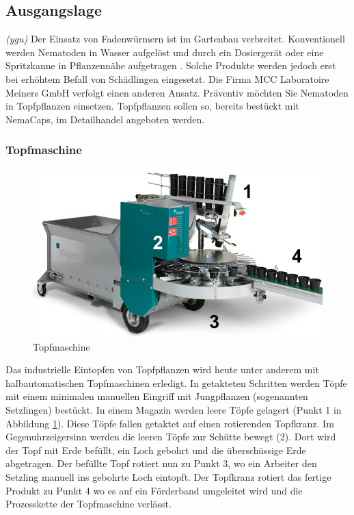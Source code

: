 
\subsection{Ausgangslage}
\textit{(ygu)} Der Einsatz von Fadenwürmern ist im Gartenbau verbreitet. Konventionell werden Nematoden in Wasser aufgelöst und durch ein Dosiergerät oder eine Spritzkanne in Pflanzennähe aufgetragen \cite{birchmeier}. Solche Produkte werden jedoch erst bei erhöhtem Befall von Schädlingen eingesetzt. Die Firma MCC Laboratoire Meiners GmbH verfolgt einen anderen Ansatz. Präventiv möchten Sie Nematoden in Topfpflanzen einsetzen. Topfpflanzen sollen so, bereits bestückt mit NemaCaps, im Detailhandel angeboten werden. 
\subsubsection{Topfmaschine}
\begin{figure}
	\includegraphics[scale=0.5]{Illustrationen/3-Einleitung/schema_topfmaschine.jpg}
	\caption{Topfmaschine \protect\cite{mayer}}
	\label{fig:schema_topfmaschine}
\end{figure}
Das industrielle Eintopfen von Topfpflanzen wird heute unter anderem mit halbautomatischen Topfmaschinen erledigt. In getakteten Schritten werden Töpfe mit einem minimalen manuellen Eingriff mit Jungpflanzen (sogenannten Setzlingen) bestückt. In einem Magazin werden leere Töpfe gelagert (Punkt 1 in Abbildung \ref{fig:schema_topfmaschine}). Diese Töpfe fallen getaktet auf einen rotierenden Topfkranz. Im Gegenuhrzeigersinn werden die leeren Töpfe zur Schütte bewegt (2). Dort wird der Topf mit Erde befüllt, ein Loch gebohrt und die überschüssige Erde abgetragen. Der befüllte Topf rotiert nun zu Punkt 3, wo ein Arbeiter den Setzling manuell ins gebohrte Loch eintopft. Der Topfkranz rotiert das fertige Produkt zu Punkt 4 wo es auf ein Förderband umgeleitet wird und die Prozesskette der Topfmaschine verlässt.

